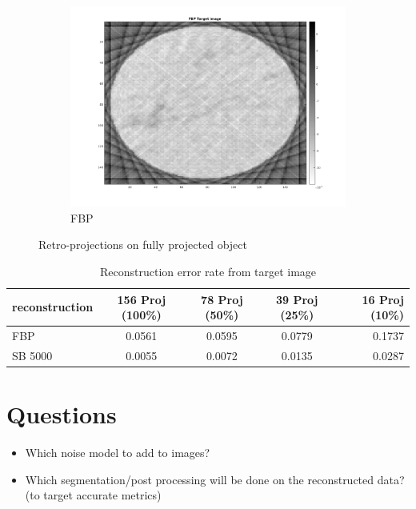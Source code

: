 \documentclass[10pt,a4paper,titlepage]{article}
\begin{document}
\begin{figure}[H]
\begin{subfigure}[b]{0.32\textwidth}
            	\centering 
            	\includegraphics[width=\textwidth]{Sample3/L-D_5000/FBP16.png}
            	\caption{FBP}    
            	\label{subfig:FBP316p}
        	\end{subfigure}
       		
       		
       		
        	\caption{Retro-projections on fully projected object}
        	\label{fig:retFully}
        	
    	\end{figure}

		\begin{table}[H]
			\begin{tabular}{ | l || c | c | c | r | }
 				\hline			
   				reconstruction	& 156 Proj (100\%)	& 78 Proj (50\%)	& 39 Proj (25\%)	& 16 Proj (10\%)  \\
   				\hline
  				FBP			    &  0.0561			& 0.0595			& 0.0779			& 0.1737\\
 				\hline  
 				SB 5000			&  0.0055			& 0.0072			& 0.0135			& 0.0287\\
 				\hline 
 			\end{tabular}
 			\caption{Reconstruction error rate from target image}
 			\label{tab:Error2000Sample3}
		\end{table}

\clearpage


	\section{Questions}
		\begin{itemize}
			\item Which noise model to add to images?
			\item Which segmentation/post processing will be done on the reconstructed data? (to target accurate metrics)
		\end{itemize}
	
\end{document}
